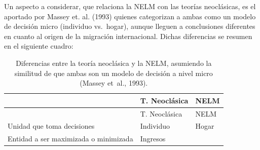 \documentclass[12pt,spanish,]{article}
\begin{document}
Un aspecto a considerar, que relaciona la NELM con las teorías
neoclásicas, es el aportado por Massey et. al. (1993) quienes
categorizan a ambas como un modelo de decisión micro (individuo
vs.~hogar), aunque lleguen a conclusiones diferentes en cuanto al origen
de la migración internacional. Dichas diferencias se resumen en el
siguiente cuadro:

\hypertarget{tbl:teorias}{}
\begin{longtable}[]{@{}lll@{}}
\caption{\label{tbl:teorias}Diferencias entre la teoría neoclásica y la
NELM, asumiendo la similitud de que ambas son un modelo de decisión a
nivel micro (Massey et~al., 1993).}\tabularnewline
\toprule
\begin{minipage}[b]{0.34\columnwidth}\raggedright
\strut
\end{minipage} & \begin{minipage}[b]{0.25\columnwidth}\raggedright
T. Neoclásica\strut
\end{minipage} & \begin{minipage}[b]{0.32\columnwidth}\raggedright
NELM\strut
\end{minipage}\tabularnewline
\midrule
\endfirsthead
\toprule
\begin{minipage}[b]{0.34\columnwidth}\raggedright
\strut
\end{minipage} & \begin{minipage}[b]{0.25\columnwidth}\raggedright
T. Neoclásica\strut
\end{minipage} & \begin{minipage}[b]{0.32\columnwidth}\raggedright
NELM\strut
\end{minipage}\tabularnewline
\midrule
\endhead
\begin{minipage}[t]{0.34\columnwidth}\raggedright
Unidad que toma decisiones\strut
\end{minipage} & \begin{minipage}[t]{0.25\columnwidth}\raggedright
Individuo\strut
\end{minipage} & \begin{minipage}[t]{0.32\columnwidth}\raggedright
Hogar\strut
\end{minipage}\tabularnewline
\begin{minipage}[t]{0.34\columnwidth}\raggedright
Entidad a ser maximizada o minimizada\strut
\end{minipage} & \begin{minipage}[t]{0.25\columnwidth}\raggedright
Ingresos\strut
\end{minipage} & \begin{minipage}[t]{0.32\columnwidth}\raggedright

\end{minipage}
\end{longtable}
\end{document}

